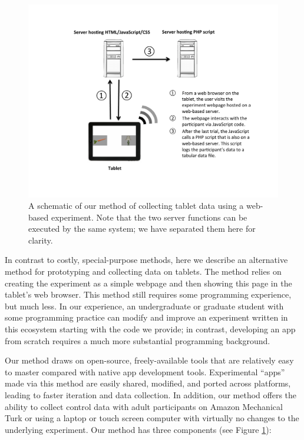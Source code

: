 \documentclass[man,noapacite]{apa2}
\begin{document}
\begin{figure}[t] 
  \begin{center} 
    \includegraphics[width=4.5in]{figures/diagram.pdf} 
    \caption{\label{fig:diagram} A schematic of our method of collecting tablet data using a web-based experiment. Note that the two server functions can be executed by the same system; we have separated them here for clarity.}
  \end{center} 
\end{figure}

In contrast to costly, special-purpose methods, here we describe an alternative method for prototyping and collecting data on tablets. The method relies on creating the experiment as a simple webpage and then showing this page in the tablet's web browser. This method still requires some programming experience, but much less. In our experience, an undergraduate or graduate student with some programming practice can modify and improve an experiment written in this ecosystem starting with the code we provide; in contrast, developing an app from scratch requires a much more substantial programming background.

Our method draws on open-source, freely-available tools that are relatively easy to master compared with native app development tools. Experimental ``apps'' made via this method are easily shared, modified, and ported across platforms, leading to faster iteration and data collection. In addition, our method offers the ability to collect control data with adult participants on Amazon Mechanical Turk  \cite{paolacci2010,crump2013} or using a laptop or touch screen computer with virtually no changes to the underlying experiment. Our method has three components (see Figure \ref{fig:diagram}):
\end{document}
